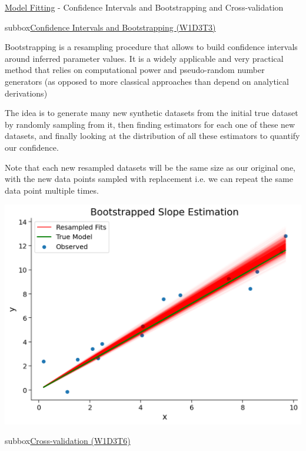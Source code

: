 \begin{textbox}{\href{https://compneuro.neuromatch.io/tutorials/W1D3_ModelFitting/student/W1D3_Tutorial2.html}{Model Fitting} -  Confidence Intervals and Bootstrapping and Cross-validation}
\begin{subbox}{subbox}{\href{https://compneuro.neuromatch.io/tutorials/W1D3_ModelFitting/student/W1D3_Tutorial3.html}{Confidence Intervals and Bootstrapping (W1D3T3)}  }

\scriptsize

 Bootstrapping is a resampling procedure that allows to build confidence intervals around inferred parameter values.
It is a widely applicable and very practical method that relies on computational power and pseudo-random number generators (as opposed to more classical approaches than depend on analytical derivations)

The idea is to generate many new synthetic datasets from the initial true dataset by randomly sampling from it, then finding estimators for each one of these new datasets, and finally looking at the distribution of all these estimators to quantify our confidence.

Note that each new resampled datasets will be the same size as our original one, with the new data points sampled with replacement i.e. we can repeat the same data point multiple times. 

\centering
\includegraphics[scale=0.2]{Figures/ModelFitting/MFFigure3.png}

\end{subbox}
\begin{subbox}{subbox}{\href{https://compneuro.neuromatch.io/tutorials/W1D3_ModelFitting/student/W1D3_Tutorial6.html}{Cross-validation (W1D3T6)}  }


\end{subbox}
\end{textbox}

